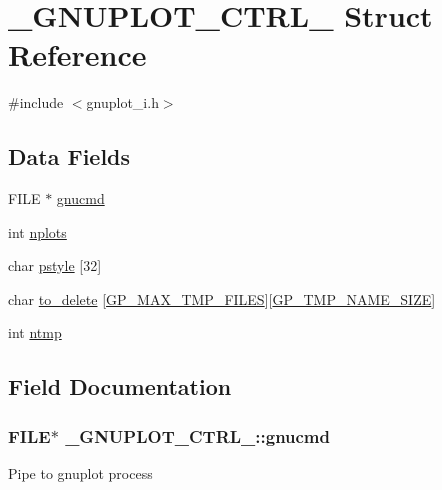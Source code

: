 \hypertarget{struct__GNUPLOT__CTRL__}{}\section{\+\_\+\+G\+N\+U\+P\+L\+O\+T\+\_\+\+C\+T\+R\+L\+\_\+ Struct Reference}
\label{struct__GNUPLOT__CTRL__}


{\ttfamily \#include $<$gnuplot\+\_\+i.\+h$>$}

\subsection*{Data Fields}
\begin{DoxyCompactItemize}
\item 
F\+I\+L\+E $\ast$ \hyperlink{struct__GNUPLOT__CTRL___aa7a57db92f1f9455de4d6bba134b4824}{gnucmd}
\item 
int \hyperlink{struct__GNUPLOT__CTRL___a5b06b0488db37f772b916098c0abd354}{nplots}
\item 
char \hyperlink{struct__GNUPLOT__CTRL___a469437799a4bf7383bdbabac2590a7ba}{pstyle} \mbox{[}32\mbox{]}
\item 
char \hyperlink{struct__GNUPLOT__CTRL___a97b62dbc77e2491651700c17c8c25551}{to\+\_\+delete} \mbox{[}\hyperlink{gnuplot__i_8h_a0b92738856c4bda43003d1c847483dd2}{G\+P\+\_\+\+M\+A\+X\+\_\+\+T\+M\+P\+\_\+\+F\+I\+L\+E\+S}\mbox{]}\mbox{[}\hyperlink{gnuplot__i_8h_a093b4c5627360601a4605251ed3495c8}{G\+P\+\_\+\+T\+M\+P\+\_\+\+N\+A\+M\+E\+\_\+\+S\+I\+Z\+E}\mbox{]}
\item 
int \hyperlink{struct__GNUPLOT__CTRL___a88196f871d2e10a48c16f7539a04b7c1}{ntmp}
\end{DoxyCompactItemize}


\subsection{Field Documentation}
\hypertarget{struct__GNUPLOT__CTRL___aa7a57db92f1f9455de4d6bba134b4824}{}
\subsubsection[{gnucmd}]{\setlength{\rightskip}{0pt plus 5cm}F\+I\+L\+E$\ast$ \+\_\+\+G\+N\+U\+P\+L\+O\+T\+\_\+\+C\+T\+R\+L\+\_\+\+::gnucmd}\label{struct__GNUPLOT__CTRL___aa7a57db92f1f9455de4d6bba134b4824}
Pipe to gnuplot process \hypertarget{struct__GNUPLOT__CTRL___a5b06b0488db37f772b916098c0abd354}{}

